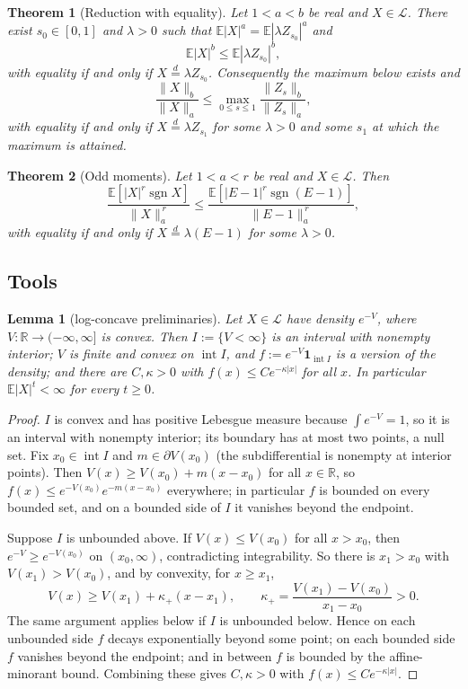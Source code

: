 \documentclass[11pt]{article}
\newtheorem{theorem}{Theorem}
\newtheorem{lemmaL}{Lemma}
\theoremstyle{remark}
\newcommand{\E}{\mathbb E}
\newcommand{\eqd}{\overset{d}{=}}
\begin{document}
\begin{theorem}[Reduction with equality]\label{thm:R2}
Let $1<a<b$ be real and $X\in\mathcal L$. There exist $s_0\in[0,1]$ and $\lambda>0$ such that $\E|X|^a=\E|\lambda Z_{s_0}|^a$ and
\[
\E|X|^b\le\E|\lambda Z_{s_0}|^b,
\]
with equality if and only if $X\eqd\lambda Z_{s_0}$. Consequently the maximum below exists and
\[
\frac{\|X\|_b}{\|X\|_a}\le\max_{0\le s\le1}\frac{\|Z_s\|_b}{\|Z_s\|_a},
\]
with equality if and only if $X\eqd\lambda Z_{s_1}$ for some $\lambda>0$ and some $s_1$ at which the maximum is attained.
\end{theorem}

\begin{theorem}[Odd moments]\label{thm:R1}
Let $1<a<r$ be real and $X\in\mathcal L$. Then
\[
\frac{\E[|X|^r\operatorname{sgn}X]}{\|X\|_a^{\,r}}\le\frac{\E[|E-1|^r\operatorname{sgn}(E-1)]}{\|E-1\|_a^{\,r}},
\]
with equality if and only if $X\eqd\lambda(E-1)$ for some $\lambda>0$.
\end{theorem}

\subsection{Tools}

\begin{lemmaL}[log-concave preliminaries]\label{lem:A}
Let $X\in\mathcal L$ have density $e^{-V}$, where $V:\mathbb R\to(-\infty,\infty]$ is convex. Then $I:=\{V<\infty\}$ is an interval with nonempty interior; $V$ is finite and convex on $\operatorname{int}I$, and $f:=e^{-V}\mathbf 1_{\operatorname{int}I}$ is a version of the density; and there are $C,\kappa>0$ with $f(x)\le Ce^{-\kappa|x|}$ for all $x$. In particular $\E|X|^t<\infty$ for every $t\ge0$.
\end{lemmaL}
\begin{proof}
$I$ is convex and has positive Lebesgue measure because $\int e^{-V}=1$, so it is an interval with nonempty interior; its boundary has at most two points, a null set. Fix $x_0\in\operatorname{int}I$ and $m\in\partial V(x_0)$ (the subdifferential is nonempty at interior points). Then $V(x)\ge V(x_0)+m(x-x_0)$ for all $x\in\mathbb R$, so $f(x)\le e^{-V(x_0)}e^{-m(x-x_0)}$ everywhere; in particular $f$ is bounded on every bounded set, and on a bounded side of $I$ it vanishes beyond the endpoint.

Suppose $I$ is unbounded above. If $V(x)\le V(x_0)$ for all $x>x_0$, then $e^{-V}\ge e^{-V(x_0)}$ on $(x_0,\infty)$, contradicting integrability. So there is $x_1>x_0$ with $V(x_1)>V(x_0)$, and by convexity, for $x\ge x_1$,
\[
V(x)\ge V(x_1)+\kappa_+(x-x_1),\qquad \kappa_+=\frac{V(x_1)-V(x_0)}{x_1-x_0}>0.
\]
The same argument applies below if $I$ is unbounded below. Hence on each unbounded side $f$ decays exponentially beyond some point; on each bounded side $f$ vanishes beyond the endpoint; and in between $f$ is bounded by the affine-minorant bound. Combining these gives $C,\kappa>0$ with $f(x)\le Ce^{-\kappa|x|}$.
\end{proof}
\end{document}
